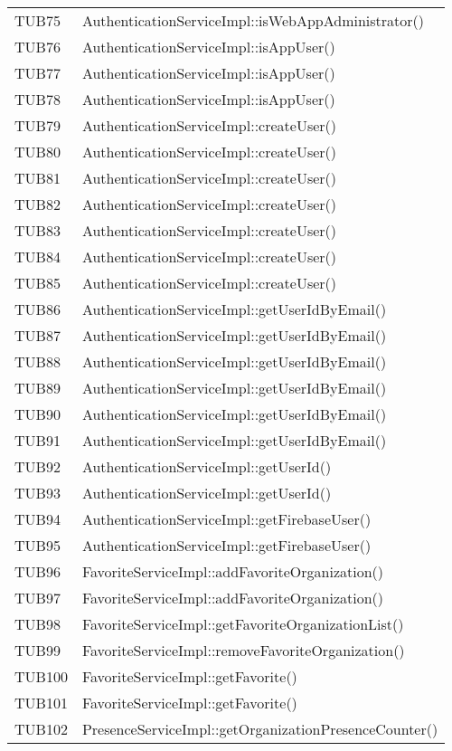 {\begin{longtable}{C{2cm} C{8cm}}
TUB75 & AuthenticationServiceImpl::isWebAppAdministrator()\\
TUB76 & AuthenticationServiceImpl::isAppUser()\\
TUB77 & AuthenticationServiceImpl::isAppUser()\\
TUB78 & AuthenticationServiceImpl::isAppUser()\\
TUB79 & AuthenticationServiceImpl::createUser()\\
TUB80 & AuthenticationServiceImpl::createUser()\\
TUB81 & AuthenticationServiceImpl::createUser()\\
TUB82 & AuthenticationServiceImpl::createUser()\\
TUB83 & AuthenticationServiceImpl::createUser()\\
TUB84 & AuthenticationServiceImpl::createUser()\\
TUB85 & AuthenticationServiceImpl::createUser()\\
TUB86 & AuthenticationServiceImpl::getUserIdByEmail()\\
TUB87 & AuthenticationServiceImpl::getUserIdByEmail()\\
TUB88 & AuthenticationServiceImpl::getUserIdByEmail()\\
TUB89 & AuthenticationServiceImpl::getUserIdByEmail()\\
TUB90 & AuthenticationServiceImpl::getUserIdByEmail()\\
TUB91 & AuthenticationServiceImpl::getUserIdByEmail()\\
TUB92 & AuthenticationServiceImpl::getUserId()\\
TUB93 & AuthenticationServiceImpl::getUserId()\\
TUB94 & AuthenticationServiceImpl::getFirebaseUser()\\
TUB95 & AuthenticationServiceImpl::getFirebaseUser()\\
TUB96 & FavoriteServiceImpl::addFavoriteOrganization()\\
TUB97 & FavoriteServiceImpl::addFavoriteOrganization()\\
TUB98 & FavoriteServiceImpl::getFavoriteOrganizationList()\\
TUB99 & FavoriteServiceImpl::removeFavoriteOrganization()\\
TUB100 & FavoriteServiceImpl::getFavorite()\\
TUB101 & FavoriteServiceImpl::getFavorite()\\
TUB102 & PresenceServiceImpl::getOrganizationPresenceCounter()\\

\end{longtable}}

